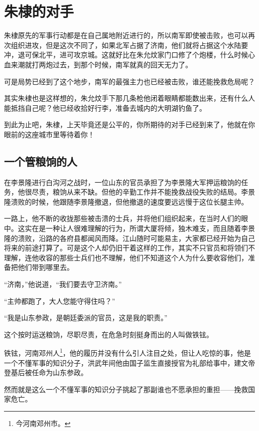 \section{朱棣的对手}
\ifnum{}
	\begin{multicols}{\theparacolNo}
		\fi
		朱棣原先的军事行动都是在自己属地附近进行的，所以南军即使被击败，也可以再次组织进攻，但是这次不同了，如果北军占据了济南，他们就将占据这个水陆要冲，退可保北平，进可攻京城。这就好比在朱允炆家门口修了个炮楼，什么时候心血来潮就打两炮过去，到那个时候，南军就真的回天无力了。

		可是局势已经到了这个地步，南军的最强主力也已经被击败，谁还能挽救危局呢？

		其实朱棣也是这样想的，朱允炆手下那几条枪他闭着眼睛都能数出来，还有什么人能抵挡自己呢？他已经收拾好行李，准备去城内的大明湖钓鱼了。

		到此为止吧，朱棣，上天毕竟还是公平的，你所期待的对手已经到来了，他就在你眼前的这座城市里等待着你！

		\subsection{一个管粮饷的人}
		在李景隆进行白沟河之战时，一位山东的官员承担了为李景隆大军押运粮饷的任务，他很尽责，粮饷从来不缺。但他的辛勤工作并不能挽救战役失败的结局。李景隆溃败的时候，他跟随李景隆撤退，但他撤退的速度要远远慢于这位长腿主帅。

		一路上，他不断的收拢那些被击溃的士兵，并将他们组织起来，在当时人们的眼中。这实在是一种让人很难理解的行为，所谓大厦将倾，独木难支，而且随着李景隆的溃败，沿路的各府县都闻风而降。江山随时可能易主，大家都已经开始为自己将来的前途打算了。可是这个人却仍旧干着这样的工作，其实不只官员和将领们不理解，连他收容的那些士兵们也不理解，他们不知道这个人为什么要收容他们，准备把他们带到哪里去。

		“济南，”他说道，“我们要去守卫济南。”

		“主帅都跑了，大人您能守得住吗？”

		“我是山东参政，是朝廷委派的官员，这是我的职责。”

		这个按时运送粮饷，尽职尽责，在危急时刻挺身而出的人叫做铁铉。

		铁铉，河南邓州人\footnote{今河南邓州市。}，他的履历并没有什么引人注目之处，但让人吃惊的事，他是一个不懂军事的知识分子，洪武年间他由国子监生直接授官为礼部给事中，建文帝登基后被任命为山东参政。

		然而就是这么一个不懂军事的知识分子挑起了那副谁也不愿承担的重担——挽救国家危亡。


\end{multicols}
